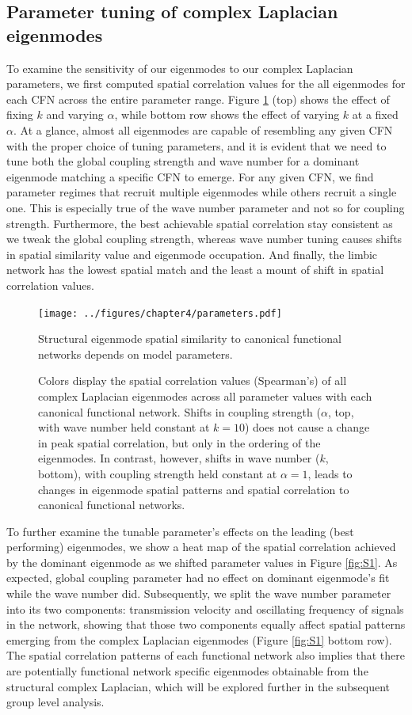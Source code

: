 \subsection{Parameter tuning of complex Laplacian eigenmodes}
To examine the sensitivity of our eigenmodes to our complex Laplacian parameters, we first computed spatial correlation values for the all eigenmodes for each CFN across the entire parameter range. Figure \ref{fig:fig4} (top) shows the effect of fixing $k$ and varying $\alpha$, while bottom row shows the effect of varying $k$ at a fixed $\alpha$. At a glance, almost all eigenmodes are capable of resembling any given CFN with the proper choice of tuning parameters, and it is evident that we need to tune both the global coupling strength and wave number for a dominant eigenmode matching a specific CFN to emerge. For any given CFN, we find parameter regimes that recruit multiple eigenmodes while others recruit a single one. This is especially true of the wave number parameter and not so for coupling strength. Furthermore, the best achievable spatial correlation stay consistent as we tweak the global coupling strength, whereas wave number tuning causes shifts in spatial similarity value and eigenmode occupation. And finally, the limbic network has the lowest spatial  match  and the least a mount of shift in spatial correlation values.

\begin{figure}[htbp]
\centering
\texttt{[image: ../figures/chapter4/parameters.pdf]}
\caption{Structural eigenmode spatial similarity to canonical functional networks depends on model parameters.}
\caption*{Colors display the spatial correlation values (Spearman's) of all complex Laplacian eigenmodes across all parameter values with each canonical functional network. Shifts in coupling strength ($\alpha$, top, with wave number held constant at $k=10$) does not cause a change in peak spatial correlation, but only in the ordering of the eigenmodes. In contrast, however, shifts in wave number ($k$, bottom), with coupling strength held constant at $\alpha = 1$, leads to changes in eigenmode spatial patterns and spatial correlation to canonical functional networks.}
\label{fig:fig4}
\end{figure}

To further examine the tunable parameter's effects on the leading (best performing) eigenmodes, we show a heat map of the spatial correlation achieved by the dominant eigenmode as we shifted parameter values in Figure \ref{fig:S1}. As expected, global coupling parameter had no effect on dominant eigenmode's fit while the wave number did. Subsequently, we split the wave number parameter into its two components: transmission velocity and oscillating frequency of signals in the network, showing that those two components equally affect spatial patterns emerging from the complex Laplacian eigenmodes (Figure \ref{fig:S1} bottom row). The spatial correlation patterns of each functional network also implies that there are potentially functional network specific eigenmodes obtainable from the structural complex Laplacian, which will be explored further in the subsequent group level analysis.


